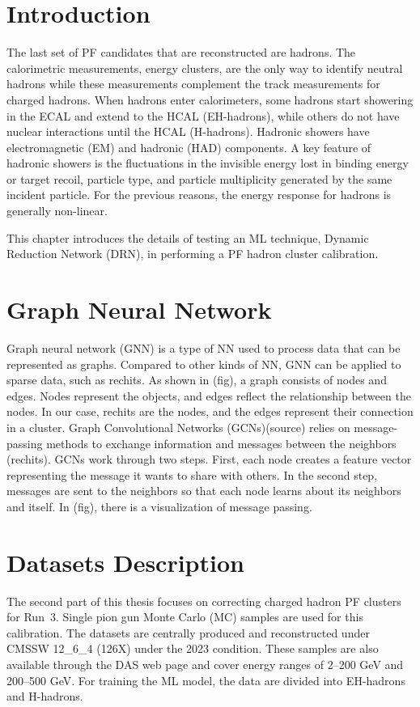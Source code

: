 \section{Introduction}
The last set of PF candidates that are reconstructed are hadrons. The calorimetric measurements, energy clusters, are the only way to identify neutral hadrons while these measurements complement the track measurements for charged hadrons. When hadrons enter calorimeters, some hadrons start showering in the ECAL and extend to the HCAL (EH-hadrons), while others do not have nuclear interactions until the HCAL (H-hadrons). Hadronic showers have electromagnetic (EM) and hadronic (HAD) components. A key feature of hadronic showers is the fluctuations in the invisible energy lost in binding energy or target recoil, particle type, and particle multiplicity generated by the same incident particle. %
For the previous reasons, the energy response for hadrons is generally non-linear.

This chapter introduces the details of testing an ML technique, Dynamic Reduction Network (DRN), in performing a PF hadron cluster calibration.


\section{Graph Neural Network} %
Graph neural network (GNN) is a type of NN used to process data that can be represented as graphs. Compared to other kinds of NN, GNN can be applied to sparse data, such as rechits. %
As shown in (fig), a graph consists of nodes and edges. Nodes represent the objects, and edges reflect the relationship between the nodes. In our case, rechits are the nodes, and the edges represent their connection in a cluster. Graph Convolutional Networks (GCNs)(source) relies on message-passing methods to exchange information and messages between the neighbors (rechits). GCNs work through two steps. First, each node creates a feature vector representing the message it wants to share with others. In the second step, messages are sent to the neighbors so that each node learns about its neighbors and itself. In (fig), there is a visualization of message passing.

\section{Datasets Description}
The second part of this thesis focuses on correcting charged hadron PF clusters for Run~3. Single pion gun Monte Carlo (MC) samples are used for this calibration. The datasets are centrally produced and reconstructed under CMSSW 12\_6\_4 (126X) under the 2023 condition. These samples are also available through the DAS web page and cover energy ranges of 2--200 GeV and 200--500 GeV. For training the ML model, the data are divided into EH-hadrons and H-hadrons. %

